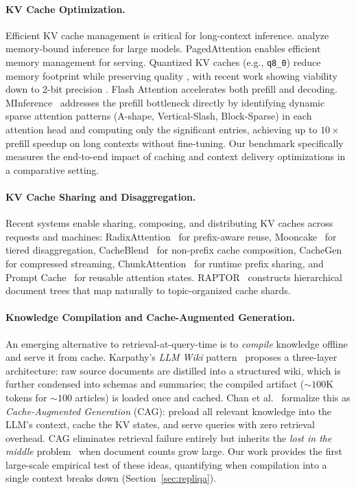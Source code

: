 \documentclass{article}
\begin{document}
\paragraph{KV Cache Optimization.}
Efficient KV cache management is critical for long-context inference.
\cite{pope2023efficiently} analyze memory-bound inference for large models.
PagedAttention \cite{kwon2023efficient} enables efficient memory management
for serving. Quantized KV caches (e.g., \texttt{q8\_0}) reduce memory
footprint while preserving quality \cite{llamacpp2024}, with recent work
showing viability down to 2-bit precision \cite{liu2024kivi}. Flash Attention
\cite{dao2022flashattention,dao2023flashattention2} accelerates both prefill
and decoding. MInference~\cite{jiang2024minference} addresses the prefill
bottleneck directly by identifying dynamic sparse attention patterns
(A-shape, Vertical-Slash, Block-Sparse) in each attention head and computing
only the significant entries, achieving up to $10\times$ prefill speedup on
long contexts without fine-tuning. Our benchmark specifically measures the
end-to-end impact of caching and context delivery optimizations in a
comparative setting.

\paragraph{KV Cache Sharing and Disaggregation.}
Recent systems enable sharing, composing, and distributing KV caches
across requests and machines:
RadixAttention~\cite{zheng2024sglang} for prefix-aware reuse,
Mooncake~\cite{qin2025mooncake} for tiered disaggregation,
CacheBlend~\cite{yao2025cacheblend} for non-prefix cache composition,
CacheGen~\cite{liu2024cachegen} for compressed streaming,
ChunkAttention~\cite{ye2024chunkattention} for runtime prefix sharing,
and Prompt Cache~\cite{gim2024promptcache} for reusable attention states.
RAPTOR~\cite{sarthi2024raptor} constructs hierarchical document trees
that map naturally to topic-organized cache shards.

\paragraph{Knowledge Compilation and Cache-Augmented Generation.}
An emerging alternative to retrieval-at-query-time is to \emph{compile}
knowledge offline and serve it from cache. Karpathy's \emph{LLM Wiki}
pattern~\cite{karpathy2026llmwiki} proposes a three-layer architecture:
raw source documents are distilled into a structured wiki, which is further
condensed into schemas and summaries; the compiled artifact (${\sim}100$K
tokens for ${\sim}100$ articles) is loaded once and cached.
Chan et al.~\cite{chan2024cag} formalize this as \emph{Cache-Augmented Generation}
(CAG): preload all relevant knowledge into the LLM's context, cache the KV
states, and serve queries with zero retrieval overhead. CAG eliminates
retrieval failure entirely but inherits the \emph{lost in the middle}
problem~\cite{liu2024lost} when document counts grow large.
Our work provides the first large-scale empirical test of these ideas,
quantifying when compilation into a single context breaks down
(Section~\ref{sec:repliqa}).
\end{document}
